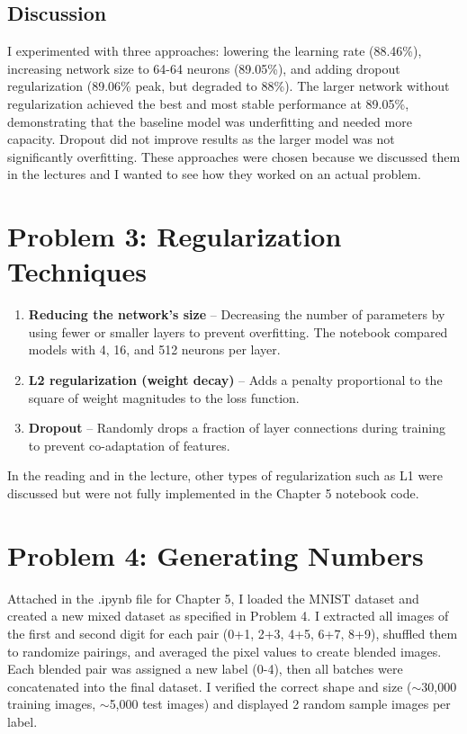 \documentclass{article}
\begin{document}
\subsection*{Discussion}

I experimented with three approaches: lowering the learning rate (88.46\%), increasing network size to 64-64 neurons (89.05\%), and adding dropout regularization (89.06\% peak, but degraded to 88\%). The larger network without regularization achieved the best and most stable performance at 89.05\%, demonstrating that the baseline model was underfitting and needed more capacity. Dropout did not improve results as the larger model was not significantly overfitting. These approaches were chosen because we discussed them in the lectures and I wanted to see how they worked on an actual problem. 

\section*{Problem 3: Regularization Techniques}

\begin{enumerate}
    \item \textbf{Reducing the network's size} -- Decreasing the number of parameters by using fewer or smaller layers to prevent overfitting. The notebook compared models with 4, 16, and 512 neurons per layer.
    
    \item \textbf{L2 regularization (weight decay)} -- Adds a penalty proportional to the square of weight magnitudes to the loss function.
    
    \item \textbf{Dropout} -- Randomly drops a fraction of layer connections during training to prevent co-adaptation of features.
\end{enumerate}
  
In the reading and in the lecture, other types of regularization such as L1 were discussed but were not fully implemented in the Chapter 5 notebook code.

\section*{Problem 4: Generating Numbers}

Attached in the .ipynb file for Chapter 5, I loaded the MNIST dataset and created a new mixed dataset as specified in Problem 4. I extracted all images of the first and second digit for each pair (0+1, 2+3, 4+5, 6+7, 8+9), shuffled them to randomize pairings, and averaged the pixel values to create blended images. Each blended pair was assigned a new label (0-4), then all batches were concatenated into the final dataset. I verified the correct shape and size ($\sim$30,000 training images, $\sim$5,000 test images) and displayed 2 random sample images per label.
\end{document}
